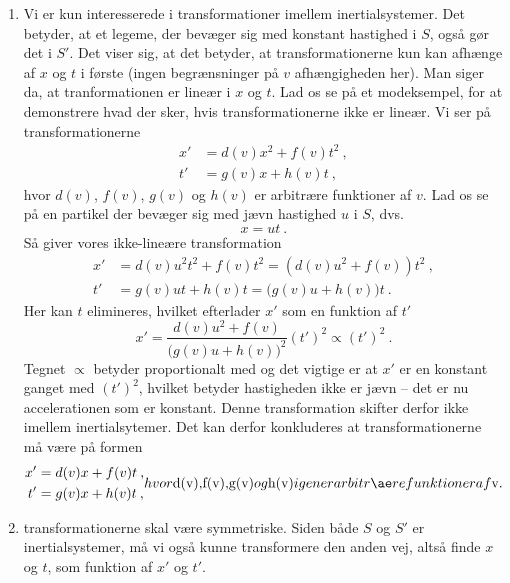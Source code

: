 \begin{enumerate}
    \item Vi er kun interesserede i transformationer imellem inertialsystemer. Det betyder, at et legeme, der bevæger sig med konstant hastighed i $S$, også gør det i $S'$.
    Det viser sig, at det betyder, at transformationerne kun kan afhænge af $x$ og $t$ i første (ingen begrænsninger på $v$ afhængigheden her).
    Man siger da, at tranformationen er lineær i $x$ og $t$.
    Lad os se på et modeksempel, for at demonstrere hvad der sker, hvis transformationerne ikke er lineær.
    Vi ser på transformationerne
    \begin{align*}
        x'&=d(v)x^2+f(v)t^2 \: ,\\
        t'&=g(v)x+h(v)t \: ,
    \end{align*}
    hvor $d(v)$, $f(v)$, $g(v)$ og $h(v)$ er arbitrære funktioner af $v$. Lad os se på en partikel der bevæger sig med jævn hastighed $u$ i $S$, dvs.
    \begin{equation*}
        x=ut \: .
    \end{equation*}
    Så giver vores ikke-lineære transformation
    \begin{align*}
        x' &= d(v)u^2t^2+f(v)t^2 = \left(d(v)u^2+f(v)\right)t^2 \: ,\\
        t' &= g(v)ut+h(v)t = \Big(g(v)u+h(v)\Big)t \: .
    \end{align*}
    Her kan $t$ elimineres, hvilket efterlader $x'$ som en funktion af $t'$
    $$
        x'=\frac{d(v)u^2+f(v)}{\big(g(v)u+h(v)\big)^2}(t')^2\propto (t')^2 \: .
    $$
    Tegnet $\propto$ betyder proportionalt med og det vigtige er at $x'$ er en konstant ganget med $(t')^2$, hvilket betyder hastigheden ikke er jævn -- det er nu accelerationen som er konstant.
    Denne transformation skifter derfor ikke imellem inertialsytemer.
    Det kan derfor konkluderes at transformationerne må være på formen
    \begin{subequations}
    \begin{align}
        x' &= d(v)x+f(v)t \: , \\
        t' &= g(v)x+h(v)t \: ,
    \end{align}
    hvor $d(v)$, $f(v)$, $g(v)$ og $h(v)$ igen er arbitrære funktioner af $v$.
    \end{subequations}
    \item transformationerne skal være symmetriske.
    Siden både $S$ og $S'$ er inertialsystemer, må vi også kunne transformere den anden vej, altså finde $x$ og $t$, som funktion af $x'$ og $t'$.

\end{enumerate}
